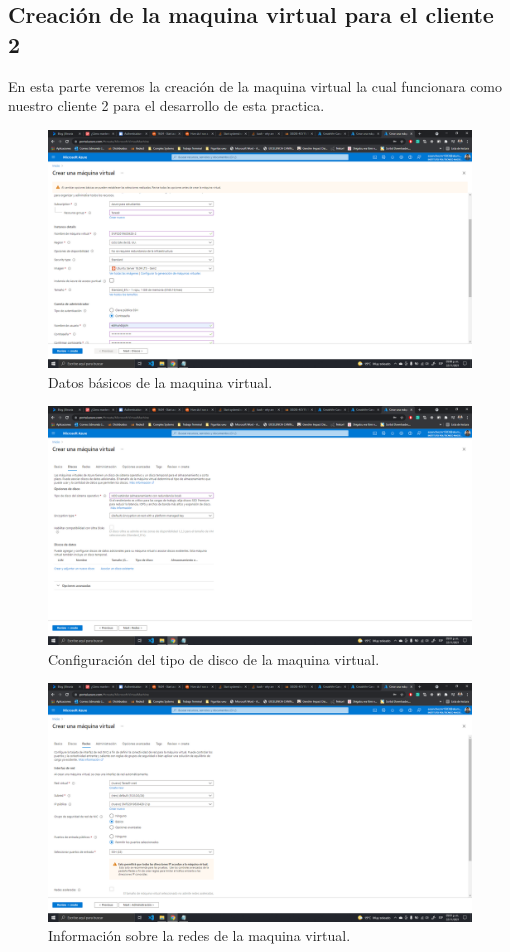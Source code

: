 \documentclass[11pt]{article}
\begin{document}
		\subsection{Creación de la maquina virtual para el cliente 2}
En esta parte veremos la creación de la maquina virtual la cual funcionara como nuestro cliente 2 para el desarrollo de esta practica.
		\begin{figure}[H]
			\centering
			\includegraphics[scale=0.34]{resources/Infobasica2.png}
			\caption{Datos básicos de la maquina virtual.}\label{fig:picture}
		\end{figure}
		\begin{figure}[H]
			\centering
			\includegraphics[scale=0.34]{resources/disco2.png}
			\caption{Configuración del tipo de disco de la maquina virtual.}\label{fig:picture}
		\end{figure}
		\begin{figure}[H]
			\centering
			\includegraphics[scale=0.34]{resources/redes2.png}
			\caption{Información sobre la redes de la maquina virtual.}\label{fig:picture}
		\end{figure}
\end{document}
